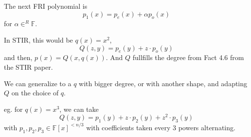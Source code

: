 \documentclass{article}
\theoremstyle{definition}
\begin{document}
The next FRI polynomial is
$$p_1(x) = p_e(x) + \alpha p_o(x)$$
for $\alpha \in^R \mathbb{F}$.

In STIR, this would be $q(x)=x^2$,
$$Q(z,y) = p_e(y) + z \cdot p_o(y)$$
and then, $p(x) = Q(x, q(x))$. And $Q$ fullfills the degree from Fact 4.6 from the STIR paper.

We can generalize to a $q$ with bigger degree, or with another shape, and adapting $Q$ on the choice of $q$.

eg. for $q(x)=x^3$, we can take
$$Q(z,y) = p_1(y) + z \cdot p_2(y) + z^2 \cdot p_3(y)$$
with $p_1, p_2, p_3 \in \mathbb{F}[x]^{<n/3}$ with coefficients taken every 3 powers alternating.



\end{document}
